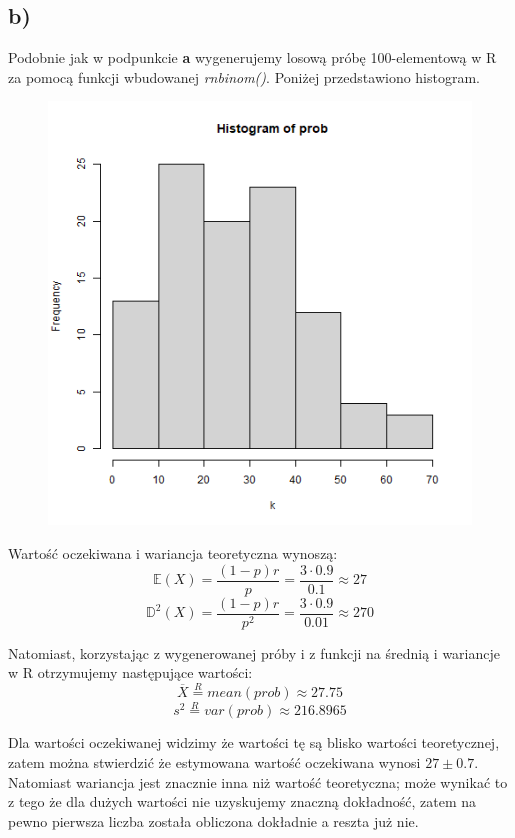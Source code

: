 \documentclass{article}
\begin{document}
\subsection{b)}
Podobnie jak w podpunkcie \textbf{a} wygenerujemy losową próbę 100-elementową w R za pomocą funkcji wbudowanej \textit{rnbinom()}. Poniżej przedstawiono histogram.
\begin{figure}[h!]
\begin{center}
\includegraphics[height = 0.4\textheight, angle = 0]{"lab7zad6_b.png"}
\end{center}
\end{figure}

Wartość oczekiwana i wariancja teoretyczna wynoszą:
\[ \mathbb{E}(X) = \frac{(1-p)r}{p} = \frac{3\cdot0.9}{0.1} \approx 27 \]
\[ \mathbb{D}^2(X) = \frac{(1-p)r}{p^2} = \frac{3\cdot0.9}{0.01} \approx 270 \]

Natomiast, korzystając z wygenerowanej próby i z funkcji na średnią i wariancje w R otrzymujemy następujące wartości:
\[ \overline{X} \overset{R}{=} mean(prob) \approx 27.75 \]
\[ s^2 \overset{R}{=} var(prob) \approx 216.8965 \]

Dla wartości oczekiwanej widzimy że wartości tę są blisko wartości teoretycznej, zatem można stwierdzić że estymowana wartość oczekiwana wynosi $27 \pm 0.7$. Natomiast wariancja jest znacznie inna niż wartość teoretyczna; może wynikać to z tego że dla dużych wartości nie uzyskujemy znaczną dokładność, zatem na pewno pierwsza liczba została obliczona dokładnie a reszta już nie.
\end{document}
